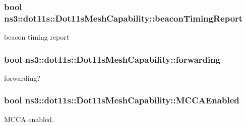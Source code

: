 \subsubsection[{\texorpdfstring{beacon\+Timing\+Report}{beaconTimingReport}}]{\setlength{\rightskip}{0pt plus 5cm}bool ns3\+::dot11s\+::\+Dot11s\+Mesh\+Capability\+::beacon\+Timing\+Report}\hypertarget{classns3_1_1dot11s_1_1Dot11sMeshCapability_ac1e3769c0dd485212f89fba050324b72}{}\label{classns3_1_1dot11s_1_1Dot11sMeshCapability_ac1e3769c0dd485212f89fba050324b72}


beacon timing report 

\subsubsection[{\texorpdfstring{forwarding}{forwarding}}]{\setlength{\rightskip}{0pt plus 5cm}bool ns3\+::dot11s\+::\+Dot11s\+Mesh\+Capability\+::forwarding}\hypertarget{classns3_1_1dot11s_1_1Dot11sMeshCapability_abfd5ebb63d139812a80820ff5cc5740c}{}\label{classns3_1_1dot11s_1_1Dot11sMeshCapability_abfd5ebb63d139812a80820ff5cc5740c}


forwarding? 

\subsubsection[{\texorpdfstring{M\+C\+C\+A\+Enabled}{MCCAEnabled}}]{\setlength{\rightskip}{0pt plus 5cm}bool ns3\+::dot11s\+::\+Dot11s\+Mesh\+Capability\+::\+M\+C\+C\+A\+Enabled}\hypertarget{classns3_1_1dot11s_1_1Dot11sMeshCapability_ad9e279f25aaca6f19a8251b6c5235db4}{}\label{classns3_1_1dot11s_1_1Dot11sMeshCapability_ad9e279f25aaca6f19a8251b6c5235db4}


M\+C\+CA enabled. 

